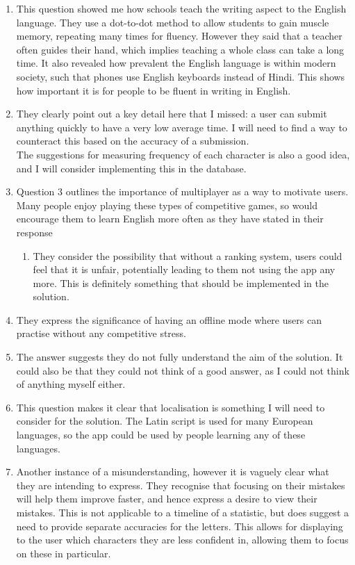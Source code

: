 \documentclass{article}
\begin{document}
\begin{enumerate}
    \item This question showed me how schools teach the writing aspect to the English language. They use a dot-to-dot method to allow students to gain muscle memory, repeating many times for fluency. However they said that a teacher often guides their hand, which implies teaching a whole class can take a long time. It also revealed how prevalent the English language is within modern society, such that phones use English keyboards instead of Hindi. This shows how important it is for people to be fluent in writing in English.
    \item They clearly point out a key detail here that I missed: a user can submit anything quickly to have a very low average time. I will need to find a way to counteract this based on the accuracy of a submission. \\ The suggestions for measuring frequency of each character is also a good idea, and I will consider implementing this in the database.
    \item Question 3 outlines the importance of multiplayer as a way to motivate users. Many people enjoy playing these types of competitive games, so would encourage them to learn English more often as they have stated in their response
    \begin{enumerate}
        \item They consider the possibility that without a ranking system, users could feel that it is unfair, potentially leading to them not using the app any more. This is definitely something that should be implemented in the solution.
    \end{enumerate}
    \item They express the significance of having an offline mode where users can practise without any competitive stress. 
    \item The answer suggests they do not fully understand the aim of the solution. It could also be that they could not think of a good answer, as I could not think of anything myself either.
    \item This question makes it clear that localisation is something I will need to consider for the solution. The Latin script is used for many European languages, so the app could be used by people learning any of these languages.
    \item Another instance of a misunderstanding, however it is vaguely clear what they are intending to express. They recognise that focusing on their mistakes will help them improve faster, and hence express a desire to view their mistakes. This is not applicable to a timeline of a statistic, but does suggest a need to provide separate accuracies for the letters. This allows for displaying to the user which characters they are less confident in, allowing them to focus on these in particular.

\end{enumerate}
\end{document}
